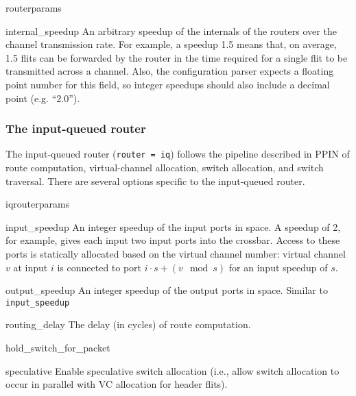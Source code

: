 \documentclass[11pt]{article}
\begin{document}
{\begin{opt_list}{routerparams}
\item[internal\_speedup] An arbitrary speedup of the internals of the
routers over the channel transmission rate.  For example, a speedup
1.5 means that, on average, 1.5 flits can be forwarded by the router
in the time required for a single flit to be transmitted across a
channel.  Also, the configuration parser expects a floating point
number for this field, so integer speedups should also include a
decimal point (e.g. ``2.0'').

\end{opt_list}

\subsubsection{The input-queued router}
\label{sec:iq_router}

The input-queued router (\texttt{router = iq}) follows the pipeline
described in PPIN of route computation, virtual-channel allocation,
switch allocation, and switch traversal.  There are several options
specific to the input-queued router.

\begin{opt_list}{iqrouterparams}

\item[input\_speedup] An integer speedup of the input ports in space.
A speedup of 2, for example, gives each input two input ports into the
crossbar.  Access to these ports is statically allocated based on the
virtual channel number: virtual channel $v$ at input $i$ is connected
to port $i \cdot s + (v \mod s)$ for an input speedup of $s$.

\item[output\_speedup] An integer speedup of the output ports in
space.  Similar to \texttt{input\_speedup}

\item[routing\_delay] The delay (in cycles) of route computation.

\item[hold\_switch\_for\_packet]

\item[speculative] Enable speculative switch allocation (i.e., allow
  switch allocation to occur in parallel with VC allocation for header
  flits). 



\end{opt_list}}
\end{document}
